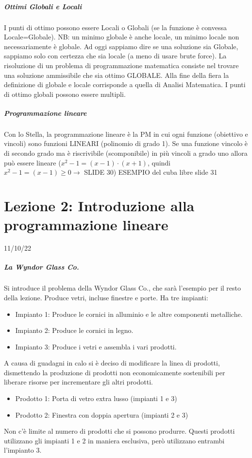 \documentclass[12pt, a4paper, openany]{book}
\begin{document}
\paragraph*{Ottimi Globali e Locali} I punti di ottimo possono essere Locali o Globali (se la funzione è convessa Locale=Globale). NB: un minimo globale è anche locale, un minimo locale non necessariamente è globale.
Ad oggi sappiamo dire se una soluzione sia Globale, sappiamo solo con certezza che sia locale (a meno di usare brute force).
La risoluzione di un problema di programmazione matematica consiste nel trovare una soluzione ammissibile che sia ottimo GLOBALE.
Alla fine della fiera la definizione di globale e locale corrisponde a quella di Analisi Matematica.
I punti di ottimo globali possono essere multipli.

\paragraph*{Programmazione lineare} Con lo Stella, la programmazione lineare è la PM in cui ogni funzione (obiettivo e vincoli) sono funzioni LINEARI (polinomio di grado 1).
Se una funzione vincolo è di secondo grado ma è riscrivibile (scomponibile) in più vincoli a grado uno allora può essere lineare ($x^2-1 =(x-1) \cdot (x+1)$, quindi $x^2-1 =(x-1) \geq 0 \to $ {SLIDE 30})
{ESEMPIO del cuba libre slide 31}

\chapter{Lezione 2: Introduzione alla programmazione lineare} 11/10/22
\paragraph*{La Wyndor Glass Co.} Si introduce il problema della Wyndor Glass Co., che sarà l'esempio per il resto della lezione.
Produce vetri, incluse finestre e porte.
Ha tre impianti:
\begin{itemize}
    \item Impianto 1: Produce le cornici in alluminio e le altre componenti metalliche.
    \item Impianto 2: Produce le cornici in legno.
    \item Impianto 3: Produce i vetri e assembla i vari prodotti.
\end{itemize}
A causa di guadagni in calo si è deciso di modificare la linea di prodotti, dismettendo la produzione di prodotti non economicamente sostenibili per liberare risorse
per incrementare gli altri prodotti.
\begin{itemize}
    \item Prodotto 1: Porta di vetro extra lusso (impianti 1 e 3)
    \item Prodotto 2: Finestra con doppia apertura (impianti 2 e 3)
\end{itemize}
Non c'è limite al numero di prodotti che si possono produrre.
Questi prodotti utilizzano gli impianti 1 e 2 in maniera esclusiva, però utilizzano entrambi l'impianto 3.
\end{document}

